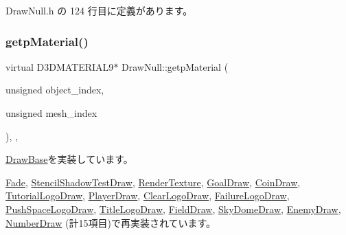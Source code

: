  Draw\+Null.\+h の 124 行目に定義があります。

\mbox{\label{class_draw_null_aa07d7e89e723b68ec257da0f63d43f70}} 
\subsubsection{\texorpdfstring{getp\+Material()}{getpMaterial()}}
{\footnotesize\ttfamily virtual D3\+D\+M\+A\+T\+E\+R\+I\+A\+L9$\ast$ Draw\+Null\+::getp\+Material (\begin{DoxyParamCaption}\item[{unsigned}]{object\+\_\+index,  }\item[{unsigned}]{mesh\+\_\+index }\end{DoxyParamCaption})\hspace{0.3cm}{\ttfamily [inline]}, {\ttfamily [override]}, {\ttfamily [virtual]}}



\mbox{\hyperlink{class_draw_base_a940543b482e934624637f3c6b4d17f96}{Draw\+Base}}を実装しています。



\mbox{\hyperlink{class_fade_a69db8b97a493082644fbd82c9ef3d1aa}{Fade}}, \mbox{\hyperlink{class_stencil_shadow_test_draw_aacdc680646f832451ea575f1da1eec9a}{Stencil\+Shadow\+Test\+Draw}}, \mbox{\hyperlink{class_render_texture_a1defe8bfacccf91dc7479a977e70578c}{Render\+Texture}}, \mbox{\hyperlink{class_goal_draw_ae7f45a84006809475aba8d9ce1b1f8a5}{Goal\+Draw}}, \mbox{\hyperlink{class_coin_draw_ad62dd6a9dd468342849a0c6ad5f8a5dd}{Coin\+Draw}}, \mbox{\hyperlink{class_tutorial_logo_draw_acbd9aefdbd4450188e561fb5e5dcd64f}{Tutorial\+Logo\+Draw}}, \mbox{\hyperlink{class_player_draw_acb94ea7611a99698507321e44b7e9acb}{Player\+Draw}}, \mbox{\hyperlink{class_clear_logo_draw_a6273330249f20ddcde3a2ab97c1bdca2}{Clear\+Logo\+Draw}}, \mbox{\hyperlink{class_failure_logo_draw_a60b0cd983365acdad363cdaf8ebdef46}{Failure\+Logo\+Draw}}, \mbox{\hyperlink{class_push_space_logo_draw_a4dc41e6b1afece431f3c321145abe541}{Push\+Space\+Logo\+Draw}}, \mbox{\hyperlink{class_title_logo_draw_aafb35175c0ffe60c7a3facf7f9cda2f2}{Title\+Logo\+Draw}}, \mbox{\hyperlink{class_field_draw_a5ed29c14e0013513d72f79f8651db805}{Field\+Draw}}, \mbox{\hyperlink{class_sky_dome_draw_a45d3e8d70753af83c84c7a7c9193459f}{Sky\+Dome\+Draw}}, \mbox{\hyperlink{class_enemy_draw_a3f2885da84533364daaaac4a801fbc46}{Enemy\+Draw}}, \mbox{\hyperlink{class_number_draw_a4e1a672907ee288fc0c2c6caecdf3904}{Number\+Draw}} (計15項目)で再実装されています。



